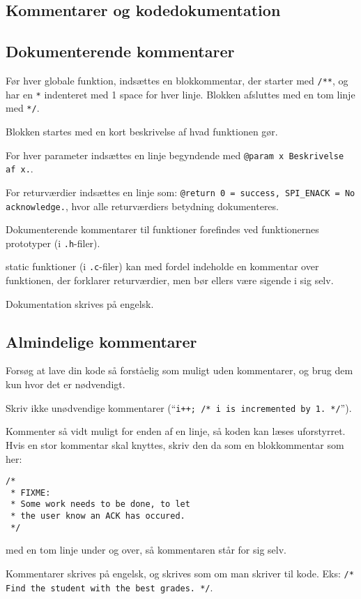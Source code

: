\documentclass[article, 10pt]{memoir}
\let\tempone\itemize
\let\temptwo\enditemize
\renewenvironment{itemize}{\tempone\firmlist}{\temptwo}
\begin{document}
\begin{multicols}{2}
    \chapter{Kommentarer og kodedokumentation}

    \section{Dokumenterende kommentarer}
    \begin{itemize}
    \item Før hver globale funktion, indsættes en blokkommentar, der starter med \texttt{/**}, og har en \texttt{*} indenteret med 1 space for hver linje. Blokken afsluttes med en tom linje med \texttt{*/}.
    \item Blokken startes med en kort beskrivelse af hvad funktionen gør.
    \item For hver parameter indsættes en linje begyndende med \texttt{@param x Beskrivelse af x.}.
    \item For returværdier indsættes en linje som: \texttt{@return 0 = success, SPI\_ENACK = No acknowledge.}, hvor alle returværdiers betydning dokumenteres.
    \item Dokumenterende kommentarer til funktioner forefindes ved funktionernes prototyper (i \texttt{.h}-filer).
    \item static funktioner (i \texttt{.c}-filer) kan med fordel indeholde en kommentar over funktionen, der forklarer returværdier, men bør ellers være sigende i sig selv.
    \item Dokumentation skrives på engelsk.
    \end{itemize}

    \section{Almindelige kommentarer}
    \begin{itemize}
    \item Forsøg at lave din kode så forståelig som muligt uden kommentarer, og brug dem kun hvor det er nødvendigt.
    \item Skriv ikke unødvendige kommentarer (``\texttt{i++; /* i is incremented by 1. */}'').
    \item Kommenter så vidt muligt for enden af en linje, så koden kan læses uforstyrret. Hvis en stor kommentar skal knyttes, skriv den da som en blokkommentar som her:
        \begin{lstlisting}
/* 
 * FIXME:
 * Some work needs to be done, to let
 * the user know an ACK has occured. 
 */
        \end{lstlisting}
        med en tom linje under og over, så kommentaren står for sig selv.
    \item Kommentarer skrives på engelsk, og skrives som om man skriver til kode. Eks: \texttt{/* Find the student with the best grades. */}.
    \end{itemize}


\end{multicols}
\end{document}
